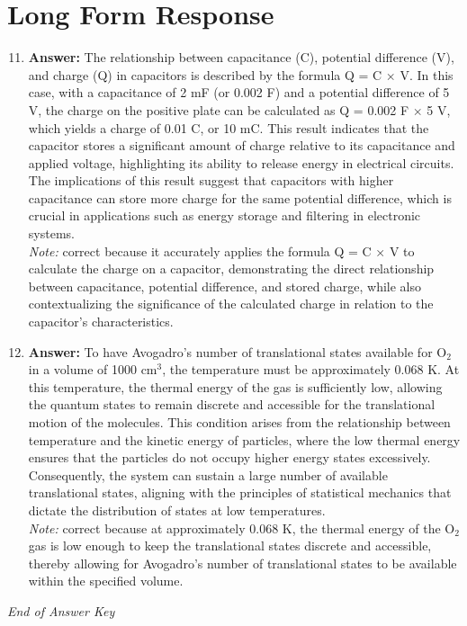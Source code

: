 \documentclass[12pt]{article}
\begin{document}
\section*{Long Form Response}
\begin{enumerate}[label=\arabic*.]
\setcounter{enumi}{10}
\item \textbf{Answer:} The relationship between capacitance (C), potential difference (V), and charge (Q) in capacitors is described by the formula Q = C \ensuremath{\times} V. In this case, with a capacitance of 2 mF (or 0.002 F) and a potential difference of 5 V, the charge on the positive plate can be calculated as Q = 0.002 F \ensuremath{\times} 5 V, which yields a charge of 0.01 C, or 10 mC. This result indicates that the capacitor stores a significant amount of charge relative to its capacitance and applied voltage, highlighting its ability to release energy in electrical circuits. The implications of this result suggest that capacitors with higher capacitance can store more charge for the same potential difference, which is crucial in applications such as energy storage and filtering in electronic systems.
\\ \textit{Note:} correct because it accurately applies the formula Q = C × V to calculate the charge on a capacitor, demonstrating the direct relationship between capacitance, potential difference, and stored charge, while also contextualizing the significance of the calculated charge in relation to the capacitor's characteristics.
\item \textbf{Answer:} To have Avogadro's number of translational states available for $\mathrm{O}_2$ in a volume of 1000 $\mathrm{cm}^3$, the temperature must be approximately 0.068 K. At this temperature, the thermal energy of the gas is sufficiently low, allowing the quantum states to remain discrete and accessible for the translational motion of the molecules. This condition arises from the relationship between temperature and the kinetic energy of particles, where the low thermal energy ensures that the particles do not occupy higher energy states excessively. Consequently, the system can sustain a large number of available translational states, aligning with the principles of statistical mechanics that dictate the distribution of states at low temperatures.
\\ \textit{Note:} correct because at approximately 0.068 K, the thermal energy of the $\mathrm{O}_2$ gas is low enough to keep the translational states discrete and accessible, thereby allowing for Avogadro's number of translational states to be available within the specified volume.
\end{enumerate}

\vfill
\noindent\textit{End of Answer Key}
\end{document}
